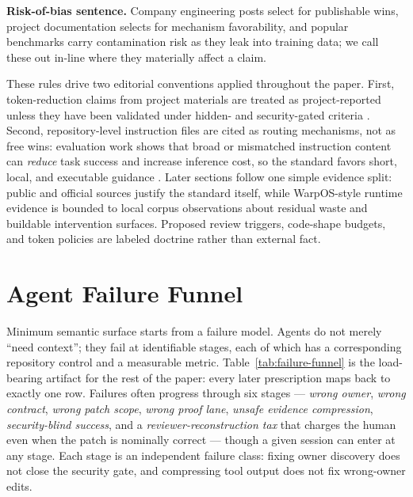 \documentclass[conference]{IEEEtran}
\begin{document}
\noindent\textbf{Risk-of-bias sentence.} Company engineering posts select for publishable wins, project documentation selects for mechanism favorability, and popular benchmarks carry contamination risk as they leak into training data; we call these out in-line where they materially affect a claim.

These rules drive two editorial conventions applied throughout the paper. First, token-reduction claims from project materials are treated as project-reported unless they have been validated under hidden- and security-gated criteria \cite{rtk2026}. Second, repository-level instruction files are cited as routing mechanisms, not as free wins: evaluation work shows that broad or mismatched instruction content can \emph{reduce} task success and increase inference cost, so the standard favors short, local, and executable guidance \cite{agentsMdEval2026,openaiAgents2026,githubCopilotInstructions2026}. Later sections follow one simple evidence split: public and official sources justify the standard itself, while WarpOS-style runtime evidence is bounded to local corpus observations about residual waste and buildable intervention surfaces. Proposed review triggers, code-shape budgets, and token policies are labeled doctrine rather than external fact.

\section{Agent Failure Funnel}
\label{sec:failure}
Minimum semantic surface starts from a failure model. Agents do not merely ``need context''; they fail at identifiable stages, each of which has a corresponding repository control and a measurable metric. Table~\ref{tab:failure-funnel} is the load-bearing artifact for the rest of the paper: every later prescription maps back to exactly one row. Failures often progress through six stages --- \emph{wrong owner}, \emph{wrong contract}, \emph{wrong patch scope}, \emph{wrong proof lane}, \emph{unsafe evidence compression}, \emph{security-blind success}, and a \emph{reviewer-reconstruction tax} that charges the human even when the patch is nominally correct --- though a given session can enter at any stage. Each stage is an independent failure class: fixing owner discovery does not close the security gate, and compressing tool output does not fix wrong-owner edits.
\end{document}
